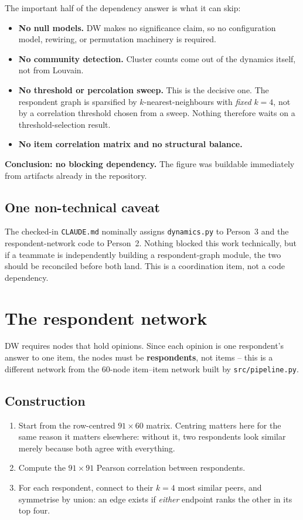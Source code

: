 \documentclass[11pt]{article}
\begin{document}
The important half of the dependency answer is what it can skip:

\begin{itemize}
  \item \textbf{No null models.} DW makes no significance claim, so no
        configuration model, rewiring, or permutation machinery is required.
  \item \textbf{No community detection.} Cluster counts come out of the
        dynamics itself, not from Louvain.
  \item \textbf{No threshold or percolation sweep.} This is the decisive one.
        The respondent graph is sparsified by $k$-nearest-neighbours with
        \emph{fixed} $k = 4$, not by a correlation threshold chosen from a
        sweep. Nothing therefore waits on a threshold-selection result.
  \item \textbf{No item correlation matrix and no structural balance.}
\end{itemize}

\textbf{Conclusion: no blocking dependency.} The figure was buildable
immediately from artifacts already in the repository.

\subsection{One non-technical caveat}
The checked-in \texttt{CLAUDE.md} nominally assigns \texttt{dynamics.py} to
Person~3 and the respondent-network code to Person~2. Nothing blocked this
work technically, but if a teammate is independently building a
respondent-graph module, the two should be reconciled before both land. This
is a coordination item, not a code dependency.

\section{The respondent network}

DW requires nodes that hold opinions. Since each opinion is one respondent's
answer to one item, the nodes must be \textbf{respondents}, not items -- this
is a different network from the 60-node item--item network built by
\texttt{src/pipeline.py}.

\subsection{Construction}
\begin{enumerate}
  \item Start from the row-centred $91 \times 60$ matrix. Centring matters
        here for the same reason it matters elsewhere: without it, two
        respondents look similar merely because both agree with everything.
  \item Compute the $91 \times 91$ Pearson correlation between respondents.
  \item For each respondent, connect to their $k = 4$ most similar peers, and
        symmetrise by union: an edge exists if \emph{either} endpoint ranks
        the other in its top four.
\end{enumerate}
\end{document}
